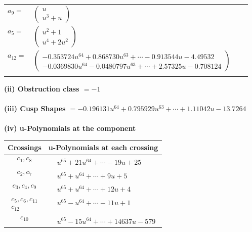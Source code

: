 \documentclass[1p]{elsarticle_modified}
\theoremstyle{definition}
\begin{document}
\begin{tabular}{m{7pt} m{180pt} m{7pt} m{180pt} }
\flushright $a_{9}=$&$\begin{pmatrix}u\\u^3+u\end{pmatrix}$ \\
\flushright $a_{5}=$&$\begin{pmatrix}u^2+1\\u^4+2 u^2\end{pmatrix}$ \\
\flushright $a_{12}=$&$\begin{pmatrix}-0.353724 u^{64}+0.868730 u^{63}+\cdots-0.913544 u-4.49532\\-0.0369830 u^{64}-0.0480797 u^{63}+\cdots+2.57325 u-0.708124\end{pmatrix}$\\&\end{tabular}
\flushleft \textbf{(ii) Obstruction class $= -1$}\\~\\
\flushleft \textbf{(iii) Cusp Shapes $= -0.196131 u^{64}+0.795929 u^{63}+\cdots+1.11042 u-13.7264$}\\~\\
\newpage\renewcommand{\arraystretch}{1}
\flushleft \textbf{(iv) u-Polynomials at the component}\newline \\
\begin{tabular}{m{50pt}|m{274pt}}
Crossings & \hspace{64pt}u-Polynomials at each crossing \\
\hline $$\begin{aligned}c_{1},c_{8}\end{aligned}$$&$\begin{aligned}
&u^{65}+21 u^{64}+\cdots-19 u+25
\end{aligned}$\\
\hline $$\begin{aligned}c_{2},c_{7}\end{aligned}$$&$\begin{aligned}
&u^{65}+u^{64}+\cdots+9 u+5
\end{aligned}$\\
\hline $$\begin{aligned}c_{3},c_{4},c_{9}\end{aligned}$$&$\begin{aligned}
&u^{65}+u^{64}+\cdots+12 u+4
\end{aligned}$\\
\hline $$\begin{aligned}c_{5},c_{6},c_{11}\\c_{12}\end{aligned}$$&$\begin{aligned}
&u^{65}- u^{64}+\cdots-11 u+1
\end{aligned}$\\
\hline $$\begin{aligned}c_{10}\end{aligned}$$&$\begin{aligned}
&u^{65}-15 u^{64}+\cdots+14637 u-579
\end{aligned}$\\
\hline
\end{tabular}\\~\\
\end{document}

